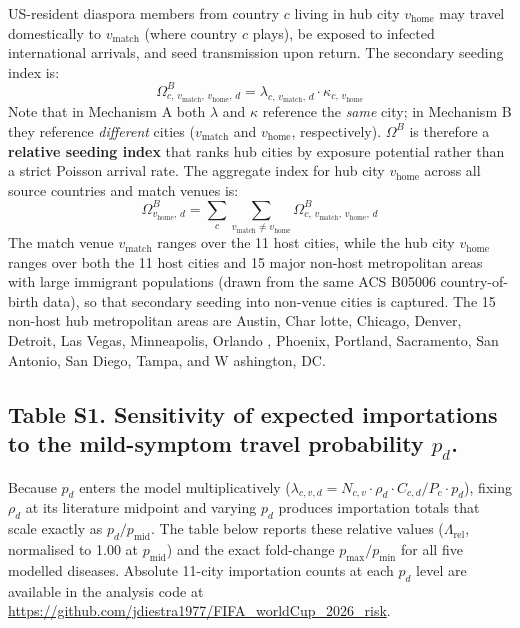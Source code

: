 \documentclass[12pt, a4paper]{article}
\begin{document}
US-resident diaspora members from country $c$ living in hub city
$v_{\text{home}}$ may travel domestically to $v_{\text{match}}$
(where country $c$ plays), be exposed to infected international
arrivals, and seed transmission upon return. The secondary seeding
index is:
\[
  \Omega^B_{c,\,v_{\text{match}},\,v_{\text{home}},\,d}
    = \lambda_{c,\,v_{\text{match}},\,d}
      \cdot \kappa_{c,\,v_{\text{home}}}
\]
Note that in Mechanism A both $\lambda$ and $\kappa$ reference the
\emph{same} city; in Mechanism B they reference \emph{different}
cities ($v_{\text{match}}$ and $v_{\text{home}}$, respectively).
$\Omega^B$ is therefore a \textbf{relative seeding index} that
ranks hub cities by exposure potential rather than a strict Poisson
arrival rate. The aggregate index for hub city $v_{\text{home}}$
across all source countries and match venues is:
\[
  \Omega^B_{v_{\text{home}},\,d}
    = \sum_c \sum_{v_{\text{match}} \neq v_{\text{home}}}
      \Omega^B_{c,\,v_{\text{match}},\,v_{\text{home}},\,d}
\]
The match venue $v_{\text{match}}$ ranges over the 11 host cities, while the hub city $v_{\text{home}}$ ranges over both the 11 host cities and 15 major non-host metropolitan areas with large immigrant populations (drawn from the same ACS B05006 country-of-birth data), so that secondary seeding into non-venue cities
is captured. The 15
non-host hub metropolitan areas are Austin, Char
lotte, Chicago,
Denver, Detroit, Las Vegas, Minneapolis, Orlando
, Phoenix, Portland,
Sacramento, San Antonio, San Diego, Tampa, and W
ashington, DC.
\newpage

\subsection*{Table S1. Sensitivity of expected importations to the mild-symptom travel probability $p_d$.}

Because $p_d$ enters the model multiplicatively
($\lambda_{c,v,d} = N_{c,v}\cdot\rho_d\cdot C_{c,d}/P_c\cdot p_d$),
fixing $\rho_d$ at its literature midpoint and varying $p_d$ produces
importation totals that scale exactly as $p_d/p_{\text{mid}}$. The
table below reports these relative values ($\Lambda_{\text{rel}}$,
normalised to 1.00 at $p_{\text{mid}}$) and the exact fold-change
$p_{\max}/p_{\min}$ for all five modelled diseases. Absolute 11-city
importation counts at each $p_d$ level are available in the
analysis code at \url{https://github.com/jdiestra1977/FIFA\_worldCup\_2026\_risk}.
\end{document}
